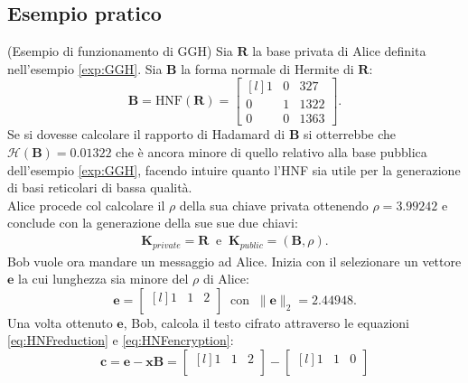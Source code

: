 \subsection{Esempio pratico}
\label{exp:HNF}

\begin{exmp} (Esempio di funzionamento di GGH)
    Sia $\mathbf{R}$ la base privata di Alice definita nell'esempio \ref{exp:GGH}. Sia $\mathbf{B}$ 
    la forma normale di Hermite di $\mathbf{R}$:
    \[
        \mathbf{B}=\text{HNF}(\mathbf{R})=
        \begin{bmatrix*}[l]
            1 & 0 & 327\\
            0 & 1 & 1322\\
            0 & 0 & 1363
        \end{bmatrix*}.
    \] 
    Se si dovesse calcolare il rapporto di Hadamard di $\mathbf{B}$ si otterrebbe che 
    $\mathcal{H}(\mathbf{B}) = 0.01322$ che è ancora minore di quello relativo alla base pubblica dell'esempio
    \ref{exp:GGH}, facendo intuire quanto l'HNF sia utile per la generazione di basi reticolari
    di bassa qualità. \\
    Alice procede col calcolare il $\rho$ della sua chiave privata ottenendo $\rho = 3.99242$ e
    conclude con la generazione della sue sue due chiavi:
    \begin{gather*}
        \mathbf{K}_{private} = \mathbf{R} 
        \ \text{ e } \  
        \mathbf{K}_{public} = (\mathbf{B}, \rho).
    \end{gather*}
    Bob vuole ora mandare un messaggio ad Alice. Inizia con il selezionare un vettore $\mathbf{e}$
    la cui lunghezza sia minore del $\rho$ di Alice:
    \[
        \mathbf{e} = 
        \begin{bmatrix*}[l]
            1 & 1 & 2\\
        \end{bmatrix*}
        \ \text{ con } \ \|\mathbf{e}\|_2 = 2.44948.
    \]
    Una volta ottenuto $\mathbf{e}$, Bob, calcola il testo cifrato attraverso
    le equazioni \ref{eq:HNFreduction} e \ref{eq:HNFencryption}:
    \[
        \mathbf{c} = \mathbf{e} - \mathbf{x}\mathbf{B} = 
        \begin{bmatrix*}[l]
            1 & 1 & 2\\
        \end{bmatrix*}
        -
        \begin{bmatrix*}[l]
            1 & 1 & 0\\
        \end{bmatrix*}
\]
\end{exmp}

